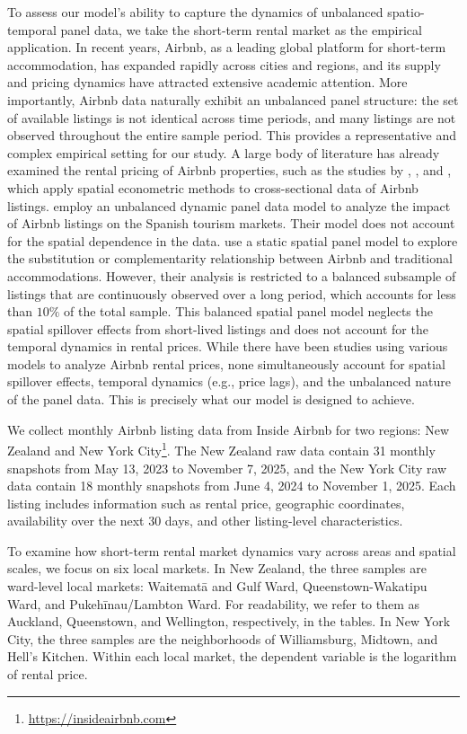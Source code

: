 \documentclass[11pt,a4paper]{article}
\begin{document}
To assess our model's ability to capture the dynamics of unbalanced spatio-temporal panel data, we take the short-term rental market as the empirical application. In recent years, Airbnb, as a leading global platform for short-term accommodation, has expanded rapidly across cities and regions, and its supply and pricing dynamics have attracted extensive academic attention. 
More importantly, Airbnb data naturally exhibit an unbalanced panel structure: the set of available listings is not identical across time periods, and many listings are not observed throughout the entire sample period. This provides a representative and complex empirical setting for our study.
A large body of literature has already examined the rental pricing of Airbnb properties, such as the studies by \cite{su9091635}, \cite{GYODI2021104319}, and \cite{WANG2023100743}, which apply spatial econometric methods to cross-sectional data of Airbnb listings.
\cite{Juan2021} employ an unbalanced dynamic panel data model to analyze the impact of Airbnb listings on the Spanish tourism markets. Their model does not account for the spatial dependence in the data.
\cite{GUNTER2020104000} use a static spatial panel model to explore the substitution or complementarity relationship between Airbnb and traditional accommodations. However, their analysis is restricted to a balanced subsample of listings that are continuously observed over a long period, which accounts for less than $10\%$ of the total sample. This balanced spatial panel model neglects the spatial spillover effects from short-lived listings and does not account for the temporal dynamics in rental prices. While there have been studies using various models to analyze Airbnb rental prices, none simultaneously account for spatial spillover effects, temporal dynamics (e.g., price lags), and the unbalanced nature of the panel data. This is precisely what our model is designed to achieve.

We collect monthly Airbnb listing data from Inside Airbnb for two regions: New Zealand and New York City\footnote{\url{https://insideairbnb.com}}. The New Zealand raw data contain 31 monthly snapshots from May 13, 2023 to November 7, 2025, and the New York City raw data contain 18 monthly snapshots from June 4, 2024 to November 1, 2025. Each listing includes information such as rental price, geographic coordinates, availability over the next 30 days, and other listing-level characteristics.

To examine how short-term rental market dynamics vary across areas and spatial scales, we focus on six local markets. In New Zealand, the three samples are ward-level local markets: Waitemat\={a} and Gulf Ward, Queenstown-Wakatipu Ward, and Pukeh\={i}nau/Lambton Ward. For readability, we refer to them as Auckland, Queenstown, and Wellington, respectively, in the tables. In New York City, the three samples are the neighborhoods of Williamsburg, Midtown, and Hell's Kitchen. Within each local market, the dependent variable is the logarithm of rental price.
\end{document}
